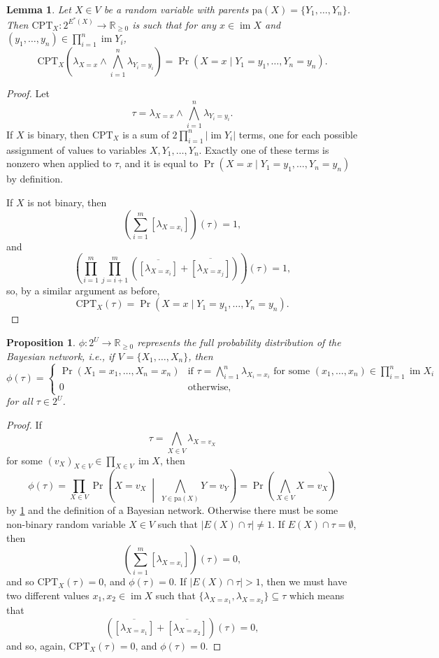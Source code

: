 \documentclass{article}
\newtheorem{lemma}{Lemma}
\newtheorem{proposition}{Proposition}
\theoremstyle{definition}
\theoremstyle{remark}
\DeclareMathOperator{\im}{im}
\begin{document}
\begin{lemma} \label{lemma:cpt}
  Let $X \in V$ be a random variable with parents $\mathrm{pa}(X) = \{ Y_1,
  \dots, Y_n \}$. Then $\mathrm{CPT}_X\colon 2^{E^*(X)} \to \mathbb{R}_{\ge 0}$
  is such that for any $x \in \im X$ and $(y_1, \dots, y_n) \in \prod_{i=1}^n
  \im Y_i$,
  \[
    \mathrm{CPT}_X \left( \lambda_{X=x} \land \bigwedge_{i=1}^n
      \lambda_{Y_i=y_i} \right) = \Pr(X = x \mid Y_1 = y_1, \dots, Y_n = y_n).
  \]
\end{lemma}
\begin{proof}
  Let
  \[
    \tau = \lambda_{X=x} \land \bigwedge_{i=1}^n \lambda_{Y_i=y_i}.
  \]
  If $X$ is binary, then $\mathrm{CPT}_X$ is a sum of $2\prod_{i=1}^n |\im Y_i|$
  terms, one for each possible assignment of values to variables $X, Y_1, \dots,
  Y_n$. Exactly one of these terms is nonzero when applied to $\tau$, and it is
  equal to $\Pr(X = x \mid Y_1 = y_1, \dots, Y_n = y_n)$ by definition.

  If $X$ is not binary, then
  \[
    \left( \sum_{i=1}^m [\lambda_{X = x_i}] \right)(\tau) = 1,
  \]
  and
  \[
    \left( \prod_{i=1}^m \prod_{j=i+1}^m (\overline{[\lambda_{X = x_i}]} +
      \overline{[\lambda_{X = x_j}]}) \right)(\tau) = 1,
  \]
  so, by a similar argument as before,
  \[
    \mathrm{CPT}_X(\tau) = \Pr(X = x \mid Y_1 = y_1, \dots, Y_n = y_n).
  \]
\end{proof}

\begin{proposition} \label{lemma:full_distribution}
  $\phi\colon 2^U \to \mathbb{R}_{\ge 0}$ represents the full probability
  distribution of the Bayesian network, i.e., if $V = \{ X_1, \dots, X_n\}$,
  then
  \[
    \phi(\tau) =
    \begin{cases}
      \Pr(X_1 = x_1, \dots, X_n = x_n) & \text{if } \tau = \bigwedge_{i=1}^n
      \lambda_{X_i = x_i} \text{ for some } (x_1, \dots, x_n) \in \prod_{i=1}^n
      \im X_i \\
      0 & \text{otherwise,}
    \end{cases}
  \]
  for all $\tau \in 2^U$.
\end{proposition}
\begin{proof}
  If
  \[
    \tau = \bigwedge_{X \in V} \lambda_{X = v_X}
  \]
  for some $(v_X)_{X \in V} \in \prod_{X \in V} \im X$, then
  \[
    \phi(\tau) = \prod_{X \in V} \Pr \left( X=v_X \;\middle|\; \bigwedge_{Y \in
        \mathrm{pa}(X)} Y=v_Y \right) = \Pr \left( \bigwedge_{X \in V} X=v_X
    \right)
  \]
  by \cref{lemma:cpt} and the definition of a Bayesian network. Otherwise there
  must be some non-binary random variable $X \in V$ such that $|E(X) \cap \tau|
  \ne 1$. If $E(X) \cap \tau = \emptyset$, then
  \[
    \left( \sum_{i=1}^m [\lambda_{X = x_i}] \right)(\tau) = 0,
  \]
  and so $\mathrm{CPT}_X(\tau) = 0$, and $\phi(\tau) = 0$. If $|E(X) \cap
  \tau| > 1$, then we must have two different values $x_1, x_2 \in \im X$ such
  that $\{\lambda_{X=x_1}, \lambda_{X=x_2} \} \subseteq \tau$ which means that
  \[
    (\overline{[\lambda_{X=x_1}]} + \overline{[\lambda_{X=x_2}]})(\tau) = 0,
  \]
  and so, again, $\mathrm{CPT}_X(\tau) = 0$, and $\phi(\tau) = 0$.
\end{proof}
\end{document}
